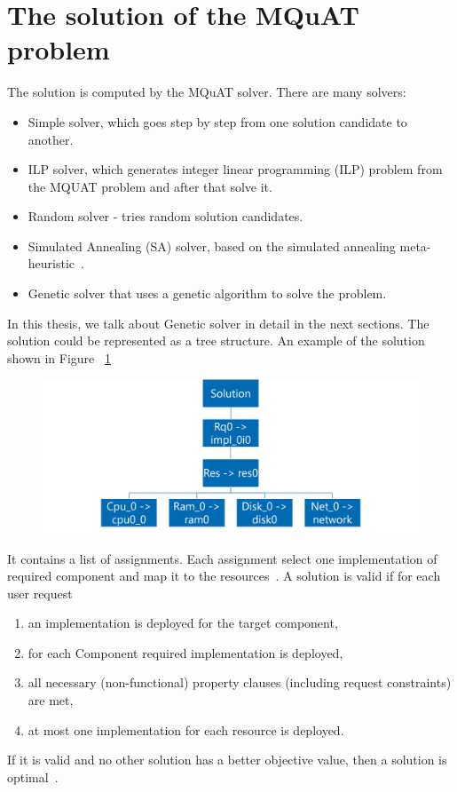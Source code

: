 \section{The solution of the MQuAT problem}
The solution is computed by the MQuAT solver. There are many solvers:
\begin{itemize}
	\item Simple solver, which goes step by step from one solution candidate to another.
	\item ILP solver, which generates integer linear programming (ILP) problem from the MQUAT problem and after that solve it.
	\item Random solver - tries random solution candidates.
	\item Simulated Annealing (SA) solver, based on the simulated annealing meta-heuristic~\cite{pukhkaiev19}.
	\item Genetic solver that uses a genetic algorithm to solve the problem.
\end{itemize}
In this thesis, we talk about Genetic solver in detail in the next sections.
The solution could be represented as a tree structure. An example of the solution shown in Figure ~\ref{fig:SolutionModel}
\begin{figure}
	\centering
	\includegraphics[width=\textwidth]{images/MQuATSolutionModel.png}
	\caption{}
	\label{fig:SolutionModel}
\end{figure}
It contains a list of assignments. Each assignment select one implementation of required component and map it to the resources~\cite{gotz18}.
A solution is valid if for each user request
\begin{enumerate}
	\item an implementation is deployed for the target component,
	\item for each Component required implementation is deployed,
	\item all necessary (non-functional) property clauses (including request constraints) are met,
	\item at most one implementation for each resource is deployed.
\end{enumerate}
If it is valid and no other solution has a better objective value, then a solution is optimal~\cite{gotz18}.


